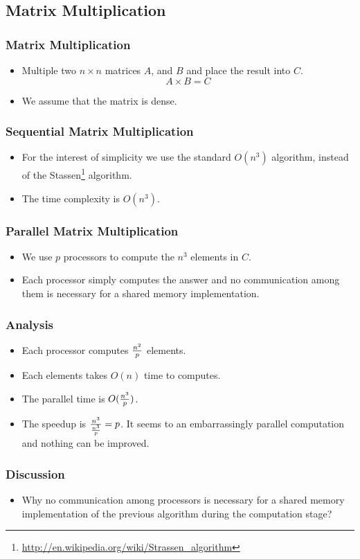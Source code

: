 \documentclass{beamer}
\begin{document}
\begin{CJK}{UTF8}{bsmi}
\subsection{Matrix Multiplication}

\begin{frame}
\frametitle{Matrix Multiplication}
\begin{itemize}
\item Multiple two $n \times n$ matrices $A$, and $B$ and place the
  result into $C$.
\begin{equation}
A \times B = C
\end{equation}
\item We assume that the matrix is dense.
\end{itemize}
\end{frame}

\begin{frame}
\frametitle{Sequential Matrix Multiplication}
\begin{itemize}
\item For the interest of simplicity we use the standard $O(n^3)$
  algorithm, instead of the
  Stassen\footnote{\url{http://en.wikipedia.org/wiki/Strassen_algorithm}}
  algorithm.
\item The time complexity is $O(n^3)$.
\end{itemize}
\end{frame}

\begin{frame}
\frametitle{Parallel Matrix Multiplication}
\begin{itemize}
\item We use $p$ processors to compute the $n^3$ elements in $C$.
\item Each processor simply computes the answer and no communication
  among them is necessary for a shared memory implementation. 
\end{itemize}
\end{frame}

\begin{frame}
\frametitle{Analysis}
\begin{itemize}
\item Each processor computes ${n^2 \over p}$ elements. 
\item Each elements takes $O(n)$ time to computes.
\item The parallel time is $O({n^3 \over p})$.
\item The speedup is ${n^3 \over {n^3 \over p}} = p$.  It seems to an
  embarrassingly parallel computation and nothing can be improved.
\end{itemize}
\end{frame}

\begin{frame}
\frametitle{Discussion}
\begin{itemize}
\item Why no communication among processors is necessary for a shared
  memory implementation of the previous algorithm during the
  computation stage?
\end{itemize}
\end{frame}


\end{CJK}
\end{document}
